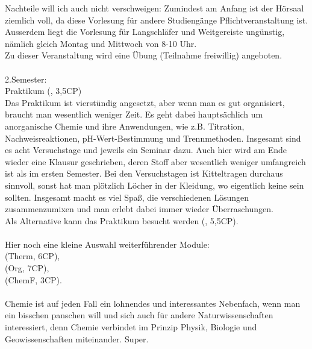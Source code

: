 Nachteile will ich auch nicht verschweigen: Zumindest am Anfang ist der H\"orsaal ziemlich voll, da diese Vorlesung f\"ur andere Studieng\"ange Pflichtveranstaltung ist. Ausserdem liegt die Vorlesung f\"ur Langschl\"afer und Weitgereiste ung\"unstig, n\"amlich gleich Montag und Mittwoch von 8-10 Uhr.\\
Zu dieser Veranstaltung wird eine \"Ubung (Teilnahme freiwillig) angeboten.\\\\
2.Semester:\\
Praktikum  (, 3,5CP)\\
Das Praktikum ist vierst\"undig angesetzt, aber wenn man es gut organisiert, braucht man wesentlich weniger Zeit. Es geht dabei haupts\"achlich um anorganische Chemie und ihre Anwendungen, wie z.B. Titration, Nachweisreaktionen, pH-Wert-Bestimmung und Trennmethoden. Insgesamt sind es acht Versuchstage und jeweils ein Seminar dazu. Auch hier wird am Ende wieder eine Klausur geschrieben, deren Stoff aber wesentlich weniger umfangreich ist als im ersten Semester. Bei den Versuchstagen ist Kitteltragen durchaus sinnvoll, sonst hat man pl\"otzlich L\"ocher in der Kleidung, wo eigentlich keine sein sollten. Insgesamt macht es viel Spa\ss , die verschiedenen L\"osungen zusammenzumixen und man erlebt dabei immer wieder \"Uberraschungen.\\
Als Alternative kann das Praktikum  besucht werden (, 5,5CP).\\\\
Hier noch eine kleine Auswahl weiterf\"uhrender Module:\\
 (Therm, 6CP),\\
 (Org, 7CP),\\
 (ChemF, 3CP).\\\\
Chemie ist auf jeden Fall ein lohnendes und interessantes Nebenfach, wenn man ein bisschen panschen will und sich auch f\"ur andere Naturwissenschaften interessiert, denn Chemie verbindet im Prinzip Physik, Biologie und Geowissenschaften miteinander. Super.
